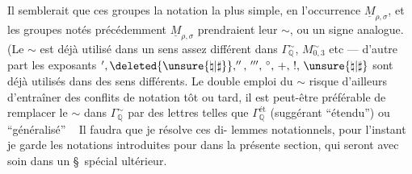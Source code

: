 Il semblerait que ces groupes  la notation la plus simple,
en l'occurrence $\underline M_{\rho,\sigma}$, et les groupes notés
précédemment $\underline M_{\rho,\sigma}$ prendraient leur $\sim$,
ou un signe analogue. (Le $\sim$ est déjà utilisé dans un sens assez
différent dans $\Gamma_{\mathbb Q}^{\sim}$,
$M_{0,3}^{\sim}$ etc --- d'autre part les exposants
$',\deleted{\unsure{\natural|\sharp}},'',\,''',\,{}^{\circ},\,+,\,!,\,
\unsure{\natural|\sharp}$
sont déjà utilisés dans des sens différents.
Le double emploi du $\sim$ risque d'ailleurs d'entraîner des conflits de
notation tôt ou tard, il est peut-être préférable de remplacer le $\sim$
dans $\Gamma_{\mathbb Q}^{\sim}$ par des lettres telles que
$\Gamma_{\mathbb Q}^{\text{ét}}$
(suggérant ``étendu'') ou 
``généralisé'' \ 
Il faudra que je résolve ces di-
lemmes notationnels, pour l'instant je garde les notations introduites pour
 dans la présente section, qui seront
 avec soin dans un \S\ spécial ultérieur.

